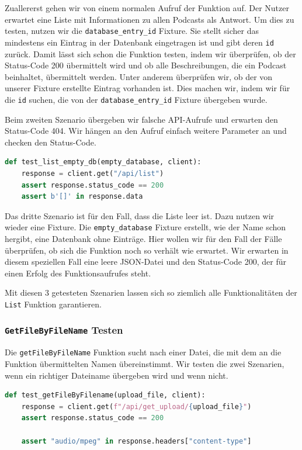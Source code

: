 \documentclass{article}
\begin{document}
Zuallererst gehen wir von einem normalen Aufruf der Funktion auf. Der Nutzer erwartet eine Liste mit Informationen zu allen Podcasts als Antwort. Um dies zu testen, nutzen wir die \texttt{database\_entry\_id} Fixture. Sie stellt sicher das mindestens ein Eintrag in der Datenbank eingetragen ist und gibt deren \texttt{id} zurück.  Damit lässt sich schon die Funktion testen, indem wir überprüfen, ob der Status-Code 200 übermittelt wird und ob alle Beschreibungen, die ein Podcast beinhaltet, übermittelt werden. Unter anderem überprüfen wir, ob der von unserer Fixture erstellte Eintrag vorhanden ist. Dies machen wir, indem wir für die \texttt{id} suchen, die von der \texttt{database\_entry\_id} Fixture übergeben wurde. 

Beim zweiten Szenario übergeben wir falsche API-Aufrufe und erwarten den Status-Code 404. Wir hängen an den Aufruf einfach weitere Parameter an und checken den Status-Code. 

\begin{lstlisting}[language=Python, caption=Test-Implementation von \texttt{/api/list} gegen eine leere Datenbank]
def test_list_empty_db(empty_database, client): 
    response = client.get("/api/list") 
    assert response.status_code == 200 
    assert b'[]' in response.data 
\end{lstlisting}

Das dritte Szenario ist für den Fall, dass die Liste leer ist. Dazu nutzen wir wieder eine Fixture. Die \texttt{empty\_database} Fixture erstellt, wie der Name schon hergibt, eine Datenbank ohne Einträge. Hier wollen wir für den Fall der Fälle überprüfen, ob sich die Funktion noch so verhält wie erwartet. Wir erwarten in diesem speziellen Fall eine leere JSON-Datei und den Status-Code 200, der für einen Erfolg des Funktionsaufrufes steht. 

Mit diesen 3 getesteten Szenarien lassen sich so ziemlich alle Funktionalitäten der \texttt{List} Funktion garantieren.  

\subsubsection{\texttt{GetFileByFileName} Testen}
Die \texttt{getFileByFileName} Funktion sucht nach einer Datei, die mit dem an die Funktion übermittelten Namen übereinstimmt. Wir testen die zwei Szenarien, wenn ein richtiger Dateiname übergeben wird und wenn nicht.

\begin{lstlisting}[language=Python, caption=Test-Implementation von \texttt{/api/get\_upload}]
def test_getFileByFilename(upload_file, client): 
    response = client.get(f"/api/get_upload/{upload_file}") 
    assert response.status_code == 200 

    assert "audio/mpeg" in response.headers["content-type"] 
\end{lstlisting}
\end{document}
